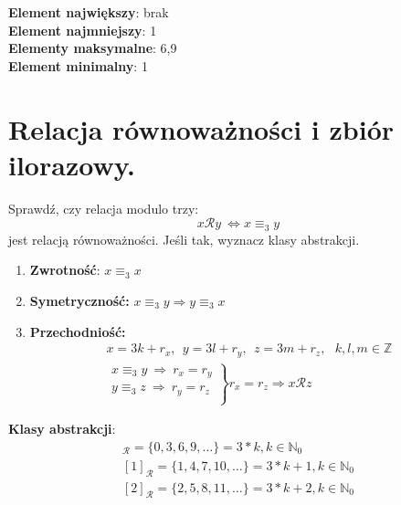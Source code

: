 \documentclass[main.tex]{subfiles}
\begin{document}
    \noindent \textbf{Element największy}: brak\\
    \textbf{Element najmniejszy}: 1\\
    \textbf{Elementy maksymalne}: 6,9\\
    \textbf{Element minimalny}: 1\\

    \newpage

    \section{Relacja równoważności i zbiór ilorazowy.}

    \begin{exercise}
        Sprawdź, czy relacja modulo trzy:
        \[ x \mathcal{R} y ~ \Leftrightarrow x \equiv_3 y\]
        jest relacją równoważności. Jeśli tak, wyznacz klasy abstrakcji.
    \end{exercise}

    \begin{enumerate}
        \item \textbf{Zwrotność}: $x \equiv_3 x$
        \item \textbf{Symetryczność:} $x \equiv_3 y \Rightarrow y \equiv_3 x$
        \item \textbf{Przechodniość:}
        \begin{align*}
            x = 3k + r_x, ~~ y = 3l + r_y, ~~ z = 3m + r_z, ~~~ k,l,m \in \mathbb{Z}\\
            \left.\begin{matrix}
                      x \equiv_3 y ~ \Rightarrow ~ r_x = r_y\\
                      y \equiv_3 z ~ \Rightarrow ~ r_y = r_z\\
            \end{matrix}\right\} r_x = r_z \Rightarrow x \mathcal{R} z
        \end{align*}
    \end{enumerate}


    \textbf{Klasy abstrakcji}:
    \begin{gather*}
    [0]
        _{\mathcal{R}} = \{0, 3, 6, 9, \dots\} = 3*k, k \in \mathbb{N}_0\\
        [1]_{\mathcal{R}} = \{1, 4, 7, 10, \dots\} = 3*k + 1, k \in \mathbb{N}_0\\
        [2]_{\mathcal{R}} = \{2, 5, 8, 11, \dots\} = 3*k + 2, k \in \mathbb{N}_0\\
    \end{gather*}
\end{document}
